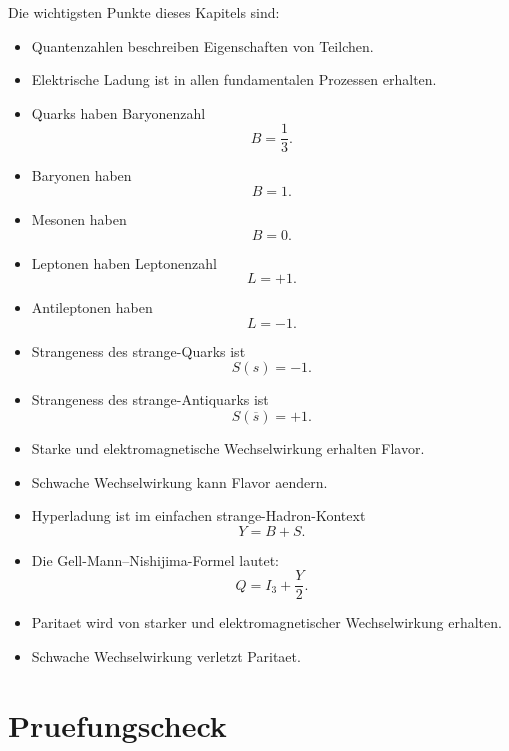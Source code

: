 \begin{notebox}
Die wichtigsten Punkte dieses Kapitels sind:
\begin{itemize}
    \item Quantenzahlen beschreiben Eigenschaften von Teilchen.
    \item Elektrische Ladung ist in allen fundamentalen Prozessen erhalten.
    \item Quarks haben Baryonenzahl
    \[
        B=\frac{1}{3}.
    \]
    \item Baryonen haben
    \[
        B=1.
    \]
    \item Mesonen haben
    \[
        B=0.
    \]
    \item Leptonen haben Leptonenzahl
    \[
        L=+1.
    \]
    \item Antileptonen haben
    \[
        L=-1.
    \]
    \item Strangeness des strange-Quarks ist
    \[
        S(s)=-1.
    \]
    \item Strangeness des strange-Antiquarks ist
    \[
        S(\overline{s})=+1.
    \]
    \item Starke und elektromagnetische Wechselwirkung erhalten Flavor.
    \item Schwache Wechselwirkung kann Flavor aendern.
    \item Hyperladung ist im einfachen strange-Hadron-Kontext
    \[
        Y=B+S.
    \]
    \item Die Gell-Mann--Nishijima-Formel lautet:
    \[
        Q=I_3+\frac{Y}{2}.
    \]
    \item Paritaet wird von starker und elektromagnetischer Wechselwirkung erhalten.
    \item Schwache Wechselwirkung verletzt Paritaet.
\end{itemize}
\end{notebox}

\section{Pruefungscheck}

